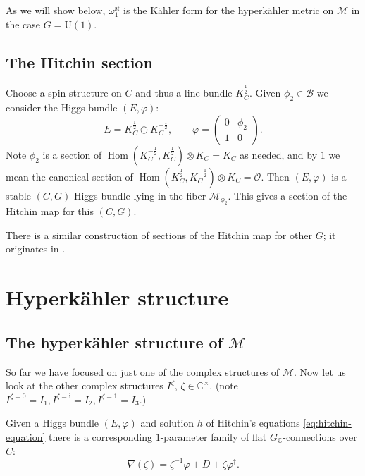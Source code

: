 \documentclass[12pt,letterpaper,reqno]{article}
\numberwithin{equation}{section}
\newcommand{\cB}{\ensuremath{\mathcal B}}
\newcommand{\cM}{\ensuremath{\mathcal M}}
\newcommand{\cO}{\ensuremath{\mathcal O}}
\newcommand{\bbC}{\ensuremath{\mathbb C}}
\newcommand{\half}{\ensuremath{\frac{1}{2}}}
\newcommand{\kahler}{K\"ahler\xspace}
\newcommand{\hk}{hyperk\"ahler\xspace}
\newcommand{\I}{{\mathrm i}}
\renewcommand{\sf}{\mathrm{sf}}
\newcommand{\vphi}{{\vec\phi}}
\DeclareMathOperator{\Hom}{Hom}
\newcommand{\SU}{\mathrm{SU}}
\newcommand{\U}{\mathrm{U}}
\begin{document}
As we will show below, $\omega_1^\sf$ is the \kahler
form for the \hk metric on $\cM$ in the case $G = \U(1)$.


\subsection{The Hitchin section}


\begin{defn}[Hitchin section, for $G = \SU(2)$]
Choose a spin structure on $C$ and thus a line bundle
$K_C^\half$.
Given $\phi_2 \in \cB$ we consider the Higgs bundle
$(E,\varphi)$:
\begin{equation}
  E = K_C^{\half} \oplus K_C^{-\half}, \qquad \varphi = \begin{pmatrix} 0 & \phi_2 \\ 1 & 0 \end{pmatrix}.
\end{equation}
Note $\phi_2$ is a section of $\Hom(K_C^{-\half}, K_C^\half) \otimes K_C = K_C$ as needed, and by $1$ we mean the 
canonical section of $\Hom(K_C^\half, K_C^{-\half}) \otimes K_C = \cO$. 
Then $(E,\varphi)$ is a stable $(C,G)$-Higgs bundle
lying in the fiber $\cM_{\phi_2}$.
This gives a section of the Hitchin map for this $(C,G)$.
\end{defn}
There is a similar construction of sections
of the Hitchin map for other $G$; it originates in \cite{MR1174252}.



\section{Hyperk\"ahler structure}

\subsection{The hyperk\"ahler structure of \texorpdfstring{$\cM$}{M}}

So far we have focused on just one of the complex
structures of $\cM$. Now let us look at the other
complex structures $I^\zeta$, $\zeta \in \bbC^\times$.
(note $I^{\zeta=0} = I_1, I^{\zeta = \I} = I_2, I^{\zeta = 1} = I_3$.)

Given a Higgs bundle $(E,\varphi)$ and 
solution $h$ of Hitchin's equations \eqref{eq:hitchin-equation}
there is a corresponding $1$-parameter family of flat
$G_\bbC$-connections over $C$:
\begin{equation}
  \nabla(\zeta) = \zeta^{-1} \varphi + D + \zeta \varphi^\dagger.
\end{equation}
\end{document}
